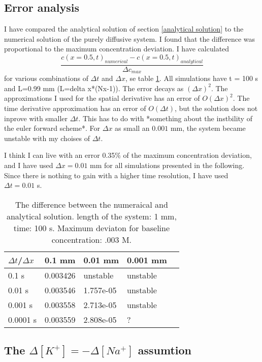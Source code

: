 \documentclass{article}
\begin{document}
\subsection{Error analysis}\label{numerical vs analytical}
I have compared the analytical solution of section \ref{analytical solution} to the numerical solution of the purely diffusive system. I found that the difference was proportional to the maximum concentration deviation. I have calculated
\begin{equation}
\frac{c(x=0.5,t)_{numerical}-c(x=0.5,t)_{analytical}}{\Delta c_{max}}
\end{equation}
for various combinations of $\Delta t$ and $\Delta x$, se table \ref{tab:error}. All simulations have t = 100 s and L=0.99 mm (L=delta x*(Nx-1)). The error decays as $(\Delta x)^2$. The approximations I used for the spatial derivative has an error of $O(\Delta x)^2$. The time derivative approximation has an error of $O(\Delta t)$, but the solution does not inprove with smaller $\Delta t$. This has to do with *something about the instbility of the euler forward scheme*.
For $\Delta x$ as small an $0.001$ mm, the system became unstable with my choises of $\Delta t$. 

I think I can live with an error 0.35\% of the maximum concentration deviation, and I have used $\Delta x = 0.01$ mm for all simulations presented in the following. Since there is nothing to gain with a higher time resolution, I have used $\Delta t = 0.01$ s. 
\begin{table}[h!]
  \centering
  \caption{The difference between the numeraical and analytical solution. length of the system: 1 mm, time: 100 s. Maximum deviaton for baseline concentration: .003 M.  }
  \label{tab:error}
  \begin{tabular}{l||l|l|l|l}
$\Delta t$/$\Delta x$ & 0.1 mm & 0.01 mm & 0.001 mm  \\
\hline
0.1 s & 0.003426 &  unstable & unstable \\
0.01 s & 0.003546 & 1.757e-05  & unstable \\
0.001 s & 0.003558 & 2.713e-05 & unstable \\
0.0001 s & 0.003559& 2.808e-05 & ? \\

 \end{tabular}
\end{table}

\subsection{The $\Delta [K^+] = - \Delta [Na^+] $ assumtion}\label{The K/Na assumtion}
\end{document}
